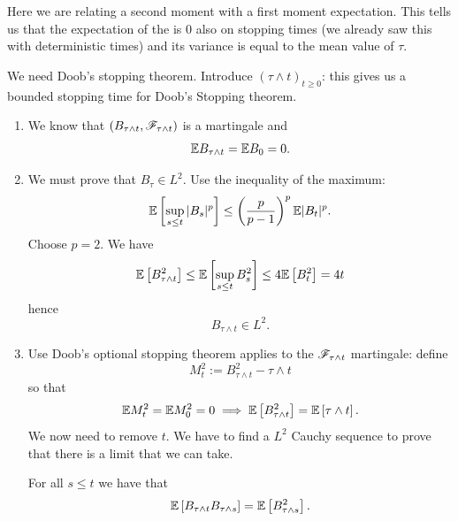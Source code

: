 \documentclass[12pt]{report}
\begin{document}
	Here we are relating a second moment with a first moment expectation. This tells us that the expectation of the \bwm{} is 0 also on stopping times (we already saw this with deterministic times) and its variance is equal to the mean value of $\tau$.
	\begin{fancyproof}
		We need Doob's stopping theorem. Introduce ${(\tau\wedge t)}_{t\geq0}$: this gives us a bounded stopping time for Doob's Stopping theorem. 
		\begin{enumerate}
			\item We know that $(B_{\tau\wedge t},\mathscr{F}_{\tau\wedge t})$ is a martingale and
			\begin{equation*}
				\mathbb{E} B_{\tau\wedge t}=\mathbb{E} B_{0}=0.
			\end{equation*}
			\item We must prove that $B_{\tau}\in L^{2}$. Use the inequality of the maximum:
			\begin{equation*}
				\mathbb{E}\left[\sup_{s\leq t}|B_{s}|^{p}\right]\leq\left(\frac{p}{p-1}\right)^{p}\mathbb{E}|B_{t}|^{p}.
			\end{equation*}
			Choose $p=2$. We have
			\begin{equation*}
				\mathbb{E}\left[B^{2}_{\tau\wedge t}\right]\leq\mathbb{E}\left[\sup_{s\leq t}B^{2}_{s}\right]\leq 4\mathbb{E}\left[B^{2}_{t}\right]=4t
			\end{equation*}
			hence
			\begin{equation*}
				B_{\tau\wedge t}\in L^{2}.
			\end{equation*}
			\item Use Doob's optional stopping theorem applies to the $\mathscr{F}_{\tau\wedge t}$ martingale: define
			\begin{equation*}
				M^{2}_{t}:=B^{2}_{\tau\wedge t}-\tau\wedge t
			\end{equation*}
			so that 
			\begin{equation*}
				\mathbb{E} M^{2}_{t}=\mathbb{E} M^{2}_{0}=0\implies \mathbb{E}\left[B^{2}_{\tau\wedge t}\right]=\mathbb{E}\left[\tau\wedge t\right].
			\end{equation*}
			We now need to remove $t$. We have to find a $L^{2}$ Cauchy sequence to prove that there is a limit that we can take.
			\begin{remark}
				For all $s\leq t$ we have that
				\begin{equation*}
					\mathbb{E}\left[B_{\tau\wedge t}B_{\tau\wedge s}\right]=\mathbb{E}\left[B^{2}_{\tau\wedge s}\right].
				\end{equation*}
			\end{remark}

\end{enumerate}
\end{fancyproof}
\end{document}
